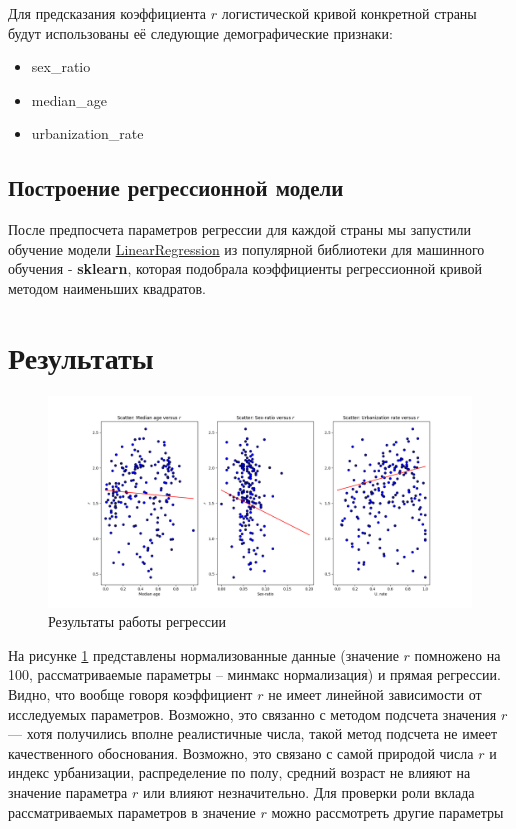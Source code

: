 \documentclass{article}
\begin{document}
Для предсказания коэффициента $r$ логистической кривой конкретной страны будут использованы её следующие демографические признаки:
\begin{itemize}
    \item sex\_ratio
    \item median\_age
    \item urbanization\_rate
\end{itemize}

\subsection{Построение регрессионной модели}
    После предпосчета параметров регрессии для каждой страны мы запустили обучение модели \href{https://scikit-learn.org/stable/modules/generated/sklearn.linear_model.LinearRegression.html}{LinearRegression} из популярной библиотеки для машинного обучения - \textbf{sklearn}, которая подобрала коэффициенты регрессионной кривой методом наименьших квадратов. 
    
\section{Результаты}

\begin{figure}[h!]
    \centering
    \includegraphics[scale=0.3]{ex.png}
    \caption{Результаты работы регрессии}
    \label{fig1}
\end{figure}

На рисунке \ref{fig1} представлены нормализованные данные (значение \(r\) помножено на 100, рассматриваемые параметры -- минмакс нормализация) и прямая регрессии. Видно, что вообще говоря коэффициент \(r\) не имеет линейной зависимости от исследуемых параметров. Возможно, это связанно с методом подсчета значения \(r\) --- хотя получились вполне реалистичные числа, такой метод подсчета не имеет качественного обоснования. Возможно, это связано с самой природой числа \(r\) и индекс урбанизации, распределение по полу, средний возраст не влияют на значение параметра \(r\) или влияют незначительно. Для проверки роли вклада рассматриваемых параметров в значение \(r\) можно рассмотреть другие параметры
\end{document}
